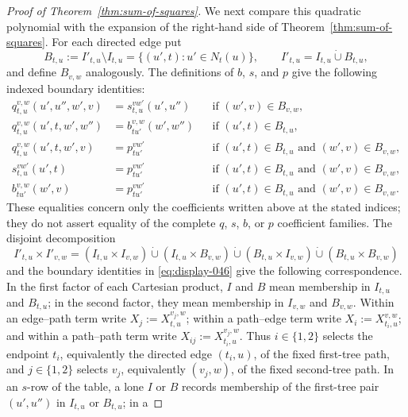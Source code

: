 \documentclass[12pt]{article}
\begin{document}
\begin{proof}[Proof of Theorem~\ref{thm:sum-of-squares}]
We next compare this quadratic polynomial with the expansion of the
right-hand side of Theorem~\ref{thm:sum-of-squares}.  For each directed edge
put
\begin{equation}\label{eq:display-045}
B_{t,u}:=I'_{t,u}\setminus I_{t,u}
=\{(u',t):u'\in N_t(u)\},
\qquad I'_{t,u}=I_{t,u}\mathbin{\dot\cup}B_{t,u},
\end{equation}
and define $B_{v,w}$ analogously.  The definitions of $b$, $s$, and $p$ give
the following indexed boundary identities:
\begin{equation}\label{eq:display-046}
\begin{aligned}
q_{t,u}^{v,w}(u',u'',w',v)&=s_{t,u}^{vw'}(u',u'')
&&\text{if }(w',v)\in B_{v,w},\\
q_{t,u}^{v,w}(u',t,w',w'')&=b_{tu'}^{v,w}(w',w'')
&&\text{if }(u',t)\in B_{t,u},\\
q_{t,u}^{v,w}(u',t,w',v)&=p_{tu'}^{vw'}
&&\text{if }(u',t)\in B_{t,u}\text{ and }(w',v)\in B_{v,w},\\
s_{t,u}^{vw'}(u',t)&=p_{tu'}^{vw'}
&&\text{if }(u',t)\in B_{t,u}\text{ and }(w',v)\in B_{v,w},\\
b_{tu'}^{v,w}(w',v)&=p_{tu'}^{vw'}
&&\text{if }(u',t)\in B_{t,u}\text{ and }(w',v)\in B_{v,w}.
\end{aligned}
\end{equation}
These equalities concern only the coefficients written above at the stated
indices; they do not assert equality of the complete $q$, $s$, $b$, or $p$
coefficient families.
The disjoint decomposition
\begin{equation}\label{eq:display-047}
I'_{t,u}\times I'_{v,w}
=(I_{t,u}\times I_{v,w})
\mathbin{\dot\cup}(I_{t,u}\times B_{v,w})
\mathbin{\dot\cup}(B_{t,u}\times I_{v,w})
\mathbin{\dot\cup}(B_{t,u}\times B_{v,w})
\end{equation}
and the boundary identities in \eqref{eq:display-046} give the following correspondence.  In the
first factor of each Cartesian product, $I$ and $B$ mean membership in
$I_{t,u}$ and $B_{t,u}$; in the second factor, they mean membership in
$I_{v,w}$ and $B_{v,w}$.
Within an edge--path term write $X_j:=X_{t,u}^{v_j,w}$; within a path--edge
term write $X_i:=X_{t_i,u}^{v,w}$; and within a path--path term write
$X_{ij}:=X_{t_i,u}^{v_j,w}$.  Thus $i\in\{1,2\}$ selects the endpoint
$t_i$, equivalently the directed edge $(t_i,u)$, of the fixed first-tree path,
and $j\in\{1,2\}$ selects $v_j$, equivalently $(v_j,w)$, of the fixed
second-tree path.  In an $s$-row of the table, a lone $I$ or $B$ records
membership of the first-tree pair $(u',u'')$ in $I_{t,u}$ or $B_{t,u}$; in a

\end{proof}
\end{document}
